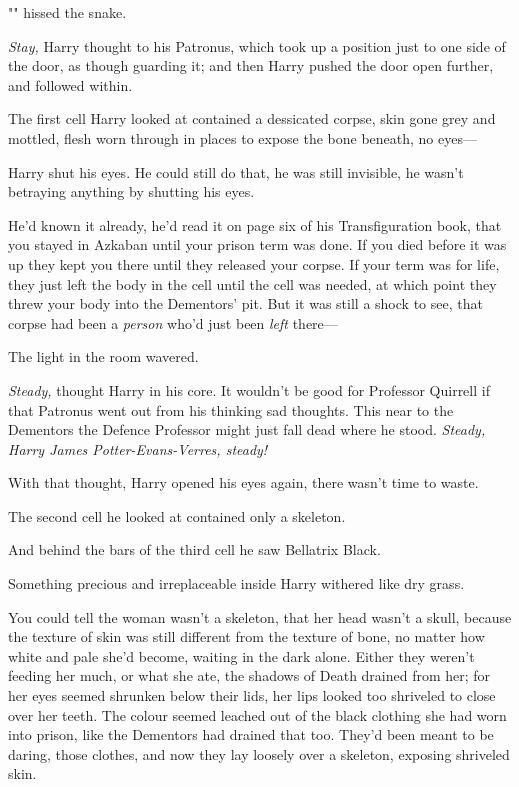 "" hissed the snake.

\emph{Stay,} Harry thought to his Patronus, which took up a position just to
one side of the door, as though guarding it; and then Harry pushed the door
open further, and followed within.

The first cell Harry looked at contained a dessicated corpse, skin gone grey
and mottled, flesh worn through in places to expose the bone beneath, no eyes---

Harry shut his eyes. He could still do that, he was still invisible, he wasn't
betraying anything by shutting his eyes.

He'd known it already, he'd read it on page six of his Transfiguration book,
that you stayed in Azkaban until your prison term was done. If you died before
it was up they kept you there until they released your corpse. If your term was
for life, they just left the body in the cell until the cell was needed, at
which point they threw your body into the Dementors' pit. But it was still a
shock to see, that corpse had been a \emph{person} who'd just been \emph{left}
there---

The light in the room wavered.

\emph{Steady,} thought Harry in his core. It wouldn't be good for Professor
Quirrell if that Patronus went out from his thinking sad thoughts. This near to
the Dementors the Defence Professor might just fall dead where he stood.
\emph{Steady, Harry James Potter-Evans-Verres, steady!}

With that thought, Harry opened his eyes again, there wasn't time to waste.

The second cell he looked at contained only a skeleton.

And behind the bars of the third cell he saw Bellatrix Black.

Something precious and irreplaceable inside Harry withered like dry grass.

You could tell the woman wasn't a skeleton, that her head wasn't a skull,
because the texture of skin was still different from the texture of bone, no
matter how white and pale she'd become, waiting in the dark alone. Either they
weren't feeding her much, or what she ate, the shadows of Death drained from
her; for her eyes seemed shrunken below their lids, her lips looked too
shriveled to close over her teeth. The colour seemed leached out of the black
clothing she had worn into prison, like the Dementors had drained that too.
They'd been meant to be daring, those clothes, and now they lay loosely over a
skeleton, exposing shriveled skin.

